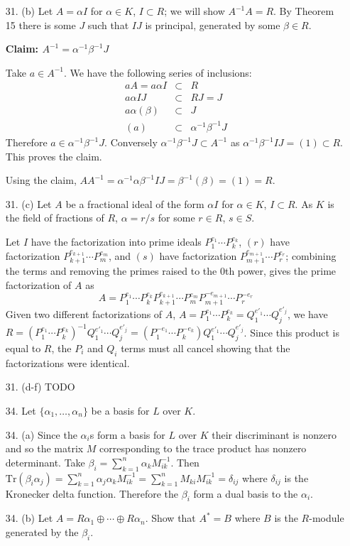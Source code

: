 \documentclass{article}
\newcommand{\trace}[1]{\text{Tr}(#1)}
\begin{document}
\begin{enumerate}
\item[31. (b)] Let $A = \alpha I$ for $\alpha \in K$, $I \subset R$; we will show $A^{-1} A = R$.  By Theorem 15 there is some $J$ such that $IJ$ is principal, generated by some $\beta \in R$.

{\bf Claim: $A^{-1} = \alpha^{-1}\beta^{-1}J$}

Take $a \in A^{-1}$. We have the following series of inclusions:
\begin{eqnarray*}
    aA = a\alpha I &\subset& R \\
    a\alpha I J &\subset& RJ = J\\
    a \alpha (\beta) &\subset& J\\
    (a) &\subset& \alpha^{-1}\beta^{-1} J
\end{eqnarray*}
Therefore $a \in \alpha^{-1}\beta^{-1} J$.  Conversely $\alpha^{-1}\beta^{-1} J \subset A^{-1}$ as $\alpha^{-1}\beta^{-1}IJ = (1) \subset R$.  This proves the claim.

Using the claim, $A A^{-1} = \alpha^{-1}\alpha \beta^{-1} IJ = \beta^{-1} (\beta) = (1) = R$.

\item[31. (c)] Let $A$ be a fractional ideal of the form $\alpha I$ for $\alpha \in K$, $I \subset R$.  As $K$ is the field of fractions of $R$, $\alpha = r / s$ for some $r \in R$, $s \in S$.

Let $I$ have the factorization into prime ideals $P_1^{e_1} \cdots P_k^{e_k}$, $(r)$ have factorization $P_{k+1}^{e_{k+1}} \cdots P_{m}^{e_m}$, and $(s)$ have factorization $P_{m+1}^{e_{m+1}} \cdots P_{r}^{e_r}$; combining the terms and removing the primes raised to the 0th power, gives the prime factorization of $A$ as \[ A = P_1^{e_1} \cdots P_k^{e_k} P_{k+1}^{e_{k+1}} \cdots P_{m}^{e_m} P_{m+1}^{-e_{m+1}} \cdots P_{r}^{-e_r} \]
Given two different factorizations of $A$, $A = P_1^{e_1} \cdots P_k^{e_k} = Q_1^{e'_1} \cdots Q_j^{e'_j}$, we have $R = (P_1^{e_1} \cdots P_k^{e_k})^{-1} Q_1^{e'_1} \cdots Q_j^{e'_j} = (P_1^{-e_1} \cdots P_k^{-e_k}) Q_1^{e'_1} \cdots Q_j^{e'_j}$.  Since this product is equal to $R$, the $P_i$ and $Q_i$ terms must all cancel showing that the factorizations were identical.

\item[31. (d-f)] TODO

\item[34.] Let $\{ \alpha_1, \ldots, \alpha_n \}$ be a basis for $L$ over $K$.
\item[34. (a)] Since the $\alpha_i$s form a basis for $L$ over $K$ their discriminant is nonzero and so the matrix $M$ corresponding to the trace product has nonzero determinant.  Take $\beta_i = \sum_{k = 1}^{n} \alpha_k M^{-1}_{ik}$.  Then $\trace{\beta_i\alpha_j} = \sum_{k = 1}^{n} \alpha_j\alpha_k M^{-1}_{ik} = \sum_{k = 1}^n M_{ki} M^{-1}_{ik} = \delta_{ij}$ where $\delta_{ij}$ is the Kronecker delta function.  Therefore the $\beta_i$ form a dual basis to the $\alpha_i$.
\item[34. (b)]
Let $A = R\alpha_1 \oplus \cdots \oplus R \alpha_n$.  Show that $A^{*} = B$ where $B$ is the $R$-module generated by the $\beta_i$.


\end{enumerate}
\end{document}
